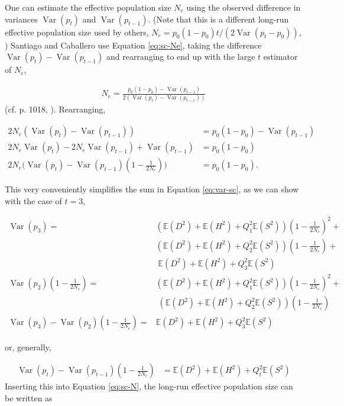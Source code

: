 \documentclass[11pt]{article}
\newcommand{\nnn}{\nonumber}
\newcommand{\E}{\mathbb{E}}
\DeclareMathOperator{\var}{Var}
\begin{document}
One can estimate the effective population size $N_e$ using the observed
difference in variances $\var(p_t)$ and $\var(p_{t-1})$. (Note that this is
a different long-run effective population size used by others, $N_e =
p_0(1-p_0) t / (2\var(p_t - p_0))$, \cite{Crow1970-wm}) Santiago and
Caballero use Equation \eqref{eq:sc-Ne}, taking the difference $\var(p_t) -
\var(p_{t-1})$ and rearranging to end up with the large $t$ estimator of $N_e$, 

\begin{align}
  N_e = \frac{p_0(1-p_0) - \var(p_{t-1})}{2(\var(p_t) - \var(p_{t-1}))}
\end{align}
%
(cf. p. 1018, \cite{Santiago1995-hx}). Rearranging,

\begin{align}
  2N_e(\var(p_t) - \var(p_{t-1})) &= p_0 (1-p_0) - \var(p_{t-1}) \nonumber \\
  2N_e \var(p_t) - 2N_e \var(p_{t-1}) + \var(p_{t-1}) &= p_0(1-p_0) \nonumber \\
  2N_e \bigg(\var(p_t) - \var(p_{t-1}) \left(1 - \frac{1}{2N_e} \right)\bigg) &= p_0(1-p_0).
  \label{eq:sc-N}
\end{align}

This very conveniently simplifies the sum in Equation \eqref{eq:var-sc}, as we
can show with the case of $t=3$,

\begin{align}
  \var(p_3) = &\left(\E(D^2)+\E(H^2)+Q_1^2 \E(S^2)\right) \left(1-\frac{1}{2 N_e}\right)^2 + \nonumber \\
              &\left(\E(D^2)+\E(H^2)+Q_2^2 \E(S^2)\right) \left(1-\frac{1}{2 N_e}\right) + \nonumber \\
              &\;\E(D^2)+\E(H^2)+Q_3^2 \E(S^2) \nonumber \\
  \var(p_2)\left(1-\frac{1}{2N_e}\right) = &\left(\E(D^2)+\E(H^2)+Q_1^2 \E(S^2)\right) \left(1-\frac{1}{2N_e}\right)^2 + \nonumber \\
                                         &\;(\E(D^2)+\E(H^2)+Q_2^2 \E(S^2)) \left(1-\frac{1}{2N_e}\right) \nonumber \\
  \var(p_3) - \var(p_2)\left(1-\frac{1}{2N_e}\right) = &\E(D^2) + \E(H^2) + Q_3^2 \E(S^2) \nnn
\end{align}

or, generally, 

\begin{align}
  \var(p_t) - \var(p_{t-1})\left(1-\frac{1}{2N_e}\right) &= \E(D^2) + \E(H^2) + Q_t^2 \E(S^2)
\end{align}
%
Inserting this into Equation \eqref{eq:sc-N}, the long-run effective population
size can be written as
\end{document}
